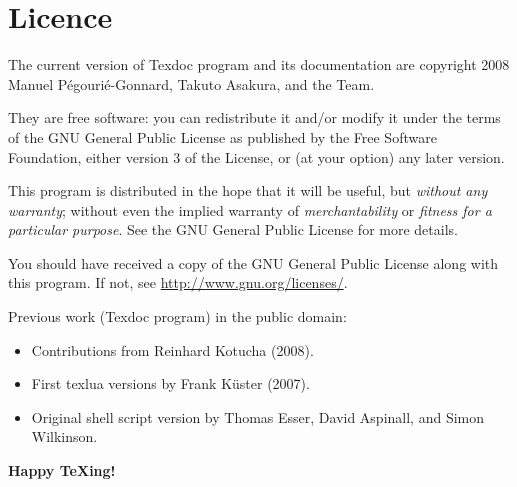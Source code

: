 \documentclass[draft]{texdoc-doc}
\begin{document}
\section{Licence}
\label{sec:licence}

The current version of Texdoc program and its documentation are copyright 2008
Manuel Pégourié-Gonnard, Takuto Asakura, and the {\TL} Team.

They are free software: you can redistribute it and/or modify it under the
terms of the GNU General Public License as published by the Free Software
Foundation, either version 3 of the License, or (at your option) any later
version.

This program is distributed in the hope that it will be useful, but
\emph{without any warranty}; without even the implied warranty of
\emph{merchantability} or \emph{fitness for a particular purpose}. See the
GNU General Public License for more details.

You should have received a copy of the GNU General Public License along with
this program. If not, see \url{http://www.gnu.org/licenses/}.

\bigskip

Previous work (Texdoc program) in the public domain:
%
\begin{itemize}
\item Contributions from Reinhard Kotucha (2008).
\item First texlua versions by Frank K\"uster (2007).
\item Original shell script version by Thomas Esser, David Aspinall, and Simon
  Wilkinson.
\end{itemize}

\bigskip

\begin{center}
\Large\bfseries
Happy {\TeX}ing!
\end{center}
\end{document}
